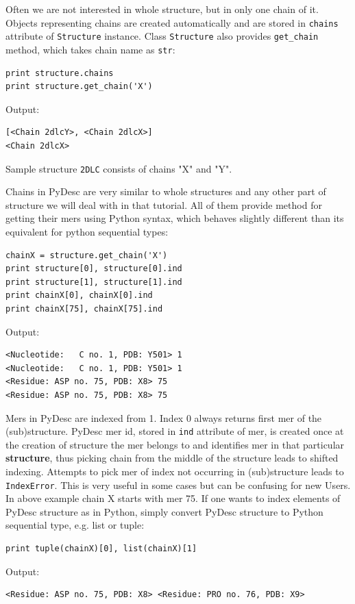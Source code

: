 \documentclass{article}
\begin{document}
Often we are not interested in whole structure, but in only one chain of it. Objects representing chains are created automatically and are stored in \texttt{chains} attribute of \texttt{Structure} instance. Class \texttt{Structure} also provides \texttt{get\_chain} method, which takes chain name as \texttt{str}:

\begin{lstlisting}
print structure.chains
print structure.get_chain('X')
\end{lstlisting}
Output:
\begin{lstlisting}
[<Chain 2dlcY>, <Chain 2dlcX>]
<Chain 2dlcX>
\end{lstlisting}

Sample structure \texttt{2DLC} consists of chains "X" and "Y".

Chains in PyDesc are very similar to whole structures and any other part of structure we will deal with in that tutorial. All of them provide method for getting their mers using Python syntax, which behaves slightly different than its equivalent for python sequential types:

\begin{lstlisting}
chainX = structure.get_chain('X')
print structure[0], structure[0].ind
print structure[1], structure[1].ind
print chainX[0], chainX[0].ind
print chainX[75], chainX[75].ind
\end{lstlisting}
Output:
\begin{lstlisting}
<Nucleotide:   C no. 1, PDB: Y501> 1
<Nucleotide:   C no. 1, PDB: Y501> 1
<Residue: ASP no. 75, PDB: X8> 75
<Residue: ASP no. 75, PDB: X8> 75
\end{lstlisting}

Mers in PyDesc are indexed from 1. Index 0 always returns first mer of the (sub)structure. PyDesc mer id, stored in \texttt{ind} attribute of mer, is created once at the creation of structure the mer belongs to and identifies mer in that particular \textbf{structure}, thus picking chain from the middle of the structure leads to shifted indexing. Attempts to pick mer of index not occurring in (sub)structure leads to \texttt{IndexError}. This is very useful in some cases but can be confusing for new Users. In above example chain X starts with mer 75. If one wants to index elements of PyDesc structure as in Python, simply convert PyDesc structure to Python sequential type, e.g. list or tuple:

\begin{lstlisting}
print tuple(chainX)[0], list(chainX)[1]
\end{lstlisting}
Output:
\begin{lstlisting}
<Residue: ASP no. 75, PDB: X8> <Residue: PRO no. 76, PDB: X9>
\end{lstlisting}
\end{document}
